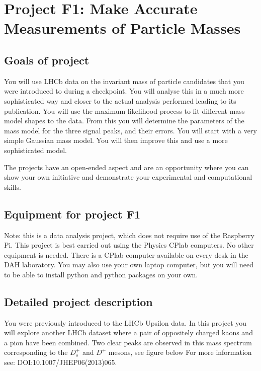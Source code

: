 

\newpage
\section{Project F1: Make Accurate Measurements of Particle Masses}

\subsection{Goals of project}

You will use LHCb data on the invariant mass of particle candidates that you were introduced to during a checkpoint. You will analyse this in a much more sophisticated way and closer to the actual analysis performed leading to its publication. You will use the maximum likelihood process to fit different mass model shapes to the data. From this you will determine the parameters of the mass model for the three signal peaks, and their errors. You will start with a very simple Gaussian mass model. You will then improve this and use a more sophisticated model.

The projects have an open-ended aspect and are an opportunity where you can show your own initiative and demonstrate your experimental and computational skills. 

\subsection{Equipment for project F1}

Note: this is a data analysis project, which does not require use of the Raspberry Pi.
This project is best carried out using the Physics CPlab computers. No other equipment is needed.  There is a CPlab computer available on every desk in the DAH laboratory.
You may also use your own laptop computer, but you will need to be able to install
python and python packages on your own. 


\subsection{Detailed project description}
 
 You were previously introduced to the LHCb Upsilon data. In this
project you will explore another LHCb dataset where a pair of
oppositely charged kaons and a pion have been combined. Two clear
peaks are observed in this mass spectrum corresponding to the $D_s^+$
and $D^+$ mesons, see figure below %
For more information see: {DOI:10.1007/JHEP06(2013)065}. 
 
